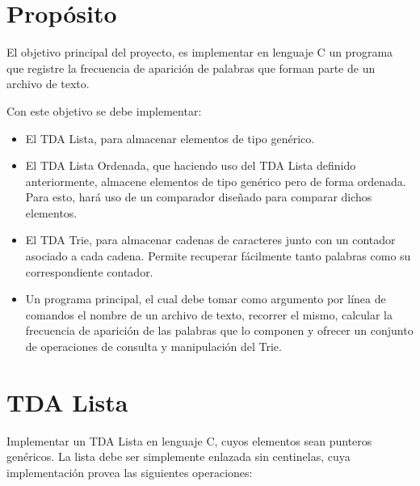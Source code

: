 \documentclass[12pt,a4paper]{article}
\begin{document}

\section*{Propósito}
El objetivo principal del proyecto, es implementar en lenguaje C un programa que registre la frecuencia de aparición de palabras que forman parte de un archivo de texto. 

Con este objetivo se debe implementar:
\begin{itemize}
	
	\item El TDA Lista, para almacenar elementos de tipo genérico.
	
	\item El TDA Lista Ordenada, que haciendo uso del TDA Lista definido anteriormente, almacene elementos de tipo genérico pero de forma ordenada. Para esto, hará uso de un comparador diseñado para comparar dichos elementos.
	
	\item El TDA Trie, para almacenar cadenas de caracteres junto con un contador asociado a cada cadena. Permite recuperar fácilmente tanto palabras como su correspondiente contador. 
	
	\item Un programa principal, el cual debe tomar como argumento por línea de comandos el nombre de un archivo de texto, recorrer el mismo, calcular la frecuencia de aparición de las palabras que lo componen y ofrecer un conjunto de operaciones de consulta y manipulación del Trie.
	
\end{itemize}

\section{TDA Lista}
Implementar un TDA Lista en lenguaje C, cuyos elementos sean punteros genéricos. La lista debe ser simplemente enlazada sin centinelas, cuya implementación provea las siguientes operaciones:
\end{document}
